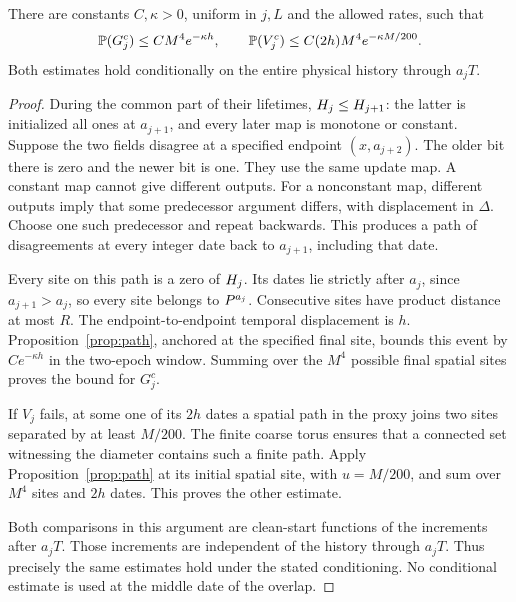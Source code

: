 \begin{lemma}\label{lem:coalescence}
There are constants \(C,\kappa>0\), uniform in \(j,L\) and the
allowed rates, such that
\begin{equation}\label{eq:window-cost}
 \mathbb P(G_j^c)\le CM^4e^{-\kappa h},\qquad
 \mathbb P(V_j^c)\le C(2h)M^4e^{-\kappa M/200}.
\end{equation}
Both estimates hold conditionally on the entire physical history
through \(a_jT\).
\end{lemma}
\begin{proof}
During the common part of their lifetimes,
\(H_j\le H_{j+1}\): the latter is initialized all ones at
\(a_{j+1}\), and every later map is monotone or constant.
Suppose the two fields disagree at a specified endpoint
\((x,a_{j+2})\). The older bit there is zero and the newer bit is
one. They use the same update map. A constant map cannot give
different outputs. For a nonconstant map, different outputs imply
that some predecessor argument differs, with displacement in
\(\Delta\). Choose one such predecessor and repeat backwards.
This produces a path of disagreements at every integer date back
to \(a_{j+1}\), including that date.

Every site on this path is a zero of \(H_j\). Its dates lie
strictly after \(a_j\), since \(a_{j+1}>a_j\), so every site belongs
to \(P^{a_j}\). Consecutive sites have product distance at most
\(R\). The endpoint-to-endpoint temporal displacement is \(h\).
Proposition~\ref{prop:path}, anchored at the specified final site,
bounds this event by \(Ce^{-\kappa h}\) in the two-epoch window.
Summing over the \(M^4\) possible final spatial sites proves the
bound for \(G_j^c\).

If \(V_j\) fails, at some one of its \(2h\) dates a spatial path in
the proxy joins two sites separated by at least \(M/200\).
The finite coarse torus ensures that a connected set witnessing
the diameter contains such a finite path. Apply
Proposition~\ref{prop:path} at its initial spatial site, with
\(u=M/200\), and sum over \(M^4\) sites and \(2h\) dates. This proves
the other estimate.

Both comparisons in this argument are clean-start functions of the
increments after \(a_jT\). Those increments are independent of the
history through \(a_jT\). Thus precisely the same estimates hold
under the stated conditioning. No conditional estimate is used at
the middle date of the overlap.
\end{proof}

